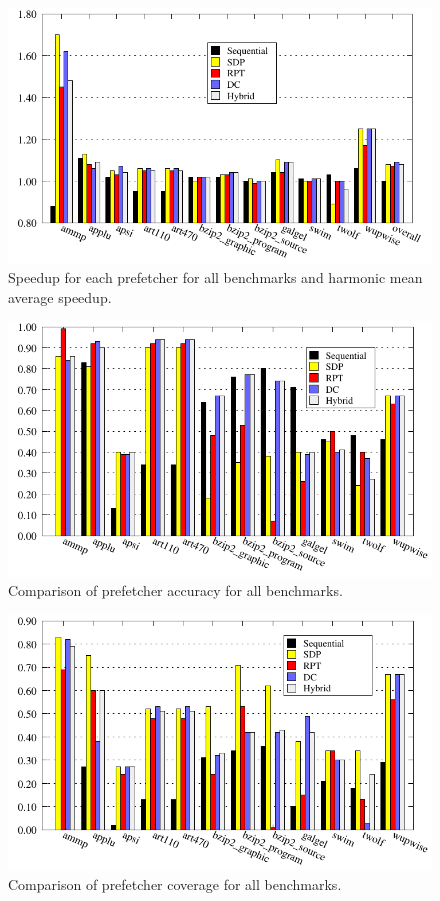\begin{figure}
  \centering
  \includegraphics{plots/overview_speedup.pdf}
  \caption{Speedup for each prefetcher for all benchmarks and harmonic mean average speedup.}
  \label{fig:comparison}
\end{figure}

\begin{figure}
  \centering
  \includegraphics{plots/accuracy_overview.pdf}
  \caption{Comparison of prefetcher accuracy for all benchmarks.}
  \label{fig:accuracy}
\end{figure}

\begin{figure}
  \centering
  \includegraphics{plots/coverage_overview.pdf}
  \caption{Comparison of prefetcher coverage for all benchmarks.}
  \label{fig:coverage}
\end{figure}


